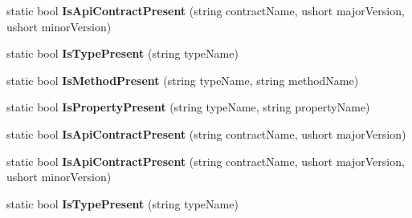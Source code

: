 \begin{DoxyCompactItemize}
\item 
\mbox{\label{class_windows_1_1_foundation_1_1_metadata_1_1_api_information_ad08ace5ceb179078666548e256829344}} 
static bool {\bfseries Is\+Api\+Contract\+Present} (string contract\+Name, ushort major\+Version, ushort minor\+Version)
\item 
\mbox{\label{class_windows_1_1_foundation_1_1_metadata_1_1_api_information_a7347d63bdbf96f8c7d2b5e7e632abf49}} 
static bool {\bfseries Is\+Type\+Present} (string type\+Name)
\item 
\mbox{\label{class_windows_1_1_foundation_1_1_metadata_1_1_api_information_a635934986da247463159c438b6e461e2}} 
static bool {\bfseries Is\+Method\+Present} (string type\+Name, string method\+Name)
\item 
\mbox{\label{class_windows_1_1_foundation_1_1_metadata_1_1_api_information_aa0236a143b0a7957254d0f59f21fef88}} 
static bool {\bfseries Is\+Property\+Present} (string type\+Name, string property\+Name)
\item 
\mbox{\label{class_windows_1_1_foundation_1_1_metadata_1_1_api_information_a673f6136fdd5584f69c299b8c5495aa5}} 
static bool {\bfseries Is\+Api\+Contract\+Present} (string contract\+Name, ushort major\+Version)
\item 
\mbox{\label{class_windows_1_1_foundation_1_1_metadata_1_1_api_information_ad08ace5ceb179078666548e256829344}} 
static bool {\bfseries Is\+Api\+Contract\+Present} (string contract\+Name, ushort major\+Version, ushort minor\+Version)
\item 
\mbox{\label{class_windows_1_1_foundation_1_1_metadata_1_1_api_information_a7347d63bdbf96f8c7d2b5e7e632abf49}} 
static bool {\bfseries Is\+Type\+Present} (string type\+Name)
\item 
\mbox{\label{class_windows_1_1_foundation_1_1_metadata_1_1_api_information_a635934986da247463159c438b6e461e2}} 

\end{DoxyCompactItemize}
